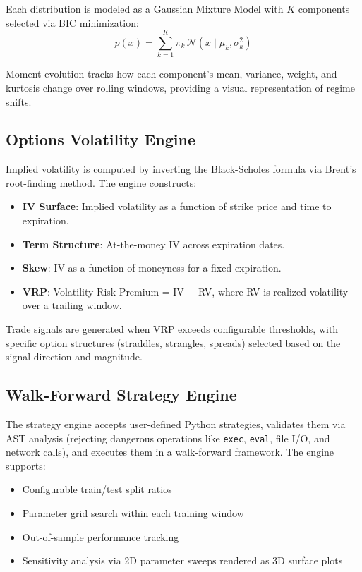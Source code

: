 \documentclass[11pt]{article}
\begin{document}
Each distribution is modeled as a Gaussian Mixture Model with $K$ components selected via BIC minimization:
\begin{equation}
    p(x) = \sum_{k=1}^{K} \pi_k \, \mathcal{N}(x \mid \mu_k, \sigma_k^2)
\end{equation}

Moment evolution tracks how each component's mean, variance, weight, and kurtosis change over rolling windows, providing a visual representation of regime shifts.

\subsection{Options Volatility Engine}

Implied volatility is computed by inverting the Black-Scholes formula via Brent's root-finding method. The engine constructs:
\begin{itemize}[nosep]
    \item \textbf{IV Surface}: Implied volatility as a function of strike price and time to expiration.
    \item \textbf{Term Structure}: At-the-money IV across expiration dates.
    \item \textbf{Skew}: IV as a function of moneyness for a fixed expiration.
    \item \textbf{VRP}: Volatility Risk Premium = IV $-$ RV, where RV is realized volatility over a trailing window.
\end{itemize}

Trade signals are generated when VRP exceeds configurable thresholds, with specific option structures (straddles, strangles, spreads) selected based on the signal direction and magnitude.

\subsection{Walk-Forward Strategy Engine}

The strategy engine accepts user-defined Python strategies, validates them via AST analysis (rejecting dangerous operations like \texttt{exec}, \texttt{eval}, file I/O, and network calls), and executes them in a walk-forward framework. The engine supports:
\begin{itemize}[nosep]
    \item Configurable train/test split ratios
    \item Parameter grid search within each training window
    \item Out-of-sample performance tracking
    \item Sensitivity analysis via 2D parameter sweeps rendered as 3D surface plots
\end{itemize}
\end{document}
